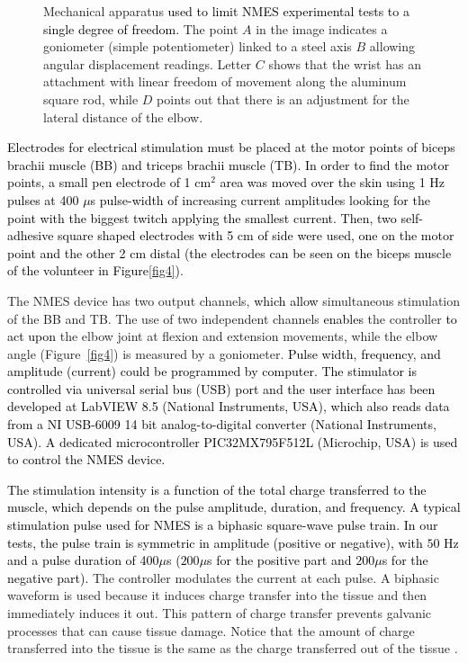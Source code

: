 \documentclass[review]{elsarticle}
\begin{document}
{\begin{figure}[!htb]
\begin{center}
\caption{Mechanical apparatus \textcolor{black}{used to limit NMES experimental tests to a single degree of freedom.} The point $A$ in the image indicates a goniometer (simple potentiometer) linked to a steel axis $B$ allowing angular displacement readings. Letter $C$ shows that the wrist has an attachment with linear freedom of movement along the aluminum square rod, while $D$ points out that there is an adjustment for the lateral distance of the elbow.}
\label{fig4_new}
\end{center}
\end{figure}
%
}

 
\textcolor{black}{Electrodes for electrical stimulation must be placed at the motor points of biceps brachii muscle (BB) and triceps brachii muscle (TB). In order to find the motor points,
a small pen electrode of 1 $\text{cm}^2$ area was moved over the skin using 1 Hz pulses at 400 $\mu$s pulse-width of increasing current amplitudes looking for the point with the biggest twitch \textcolor{black}{applying} the smallest current. Then, two self-adhesive \textcolor{black}{square shaped electrodes} with 5 cm of side were used, one on the motor point and the
other 2 cm distal (the electrodes can be seen on the biceps muscle of the volunteer in Figure\ref{fig4}). }


The NMES device has two output channels, \textcolor{black}{which allow} simultaneous stimulation of the BB and TB. The use of two independent channels \textcolor{black}{enables} the controller \textcolor{black}{to act upon} the elbow joint at flexion and extension movements, while the elbow angle (Figure~\ref{fig4}) is measured by a goniometer. \textcolor{black}{Pulse width, frequency, and amplitude (current) could be programmed by computer. The stimulator is controlled via universal serial bus (USB) port and the user interface has been developed at \textcolor{black}{LabVIEW 8.5 (National Instruments, USA)}, which also reads data from a NI USB-6009 14 bit analog-to-digital converter
(National Instruments, USA). A dedicated microcontroller PIC32MX795F512L (Microchip, USA) is used to control the NMES device.}



\textcolor{black}{The stimulation intensity is a function of the total charge transferred to the muscle, which depends on the pulse amplitude, duration, and frequency. 
A typical stimulation pulse used for NMES is a biphasic square-wave pulse train. 
In our tests, the pulse train is symmetric in amplitude (positive or negative), with $50$ Hz \cite{LP:2008} and 
a pulse duration of 400$\mu$s ($200 \mu$s for the positive part and $200 \mu$s for the negative part). }
The controller modulates the current at each pulse. A biphasic waveform is used because it induces charge transfer into the tissue and then immediately induces it out. This pattern of charge 
transfer prevents galvanic processes that can cause tissue damage. Notice that the amount of charge transferred into the tissue is the same as the charge transferred out of the tissue \cite{LP:2008}. 
\end{document}
